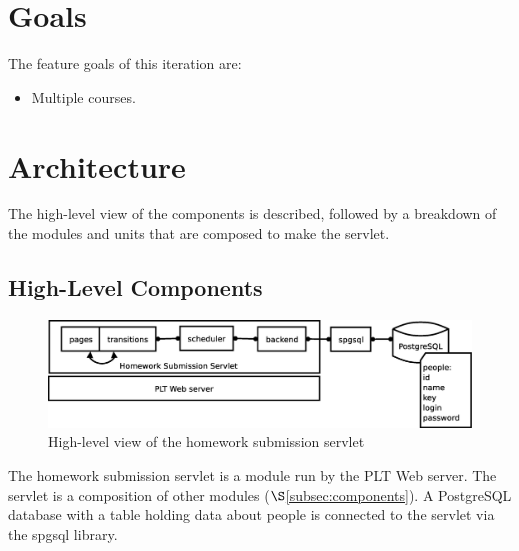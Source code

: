 \documentclass[a4paper]{article}
\begin{document}

\section{Goals}\label{sec:goals}

The feature goals of this iteration are:

\begin{itemize}
\item{Multiple courses.}
\end{itemize}

\section{Architecture}\label{sec:arch}

The high-level view of the components is described, followed by a breakdown of
the modules and units that are composed to make the servlet.

\subsection{High-Level Components}\label{subsec:high-level}

\begin{figure}[ht]
\centering
\includegraphics[scale=.35]{architecture.eps}
\caption{High-level view of the homework submission servlet}
\label{fig:architecture}
\end{figure}

The homework submission servlet is a module run by the PLT Web server. The
servlet is a composition of other modules ($\S$\ref{subsec:components}). A
PostgreSQL database with a table holding data about people is connected to the
servlet via the spgsql library.
\end{document}
